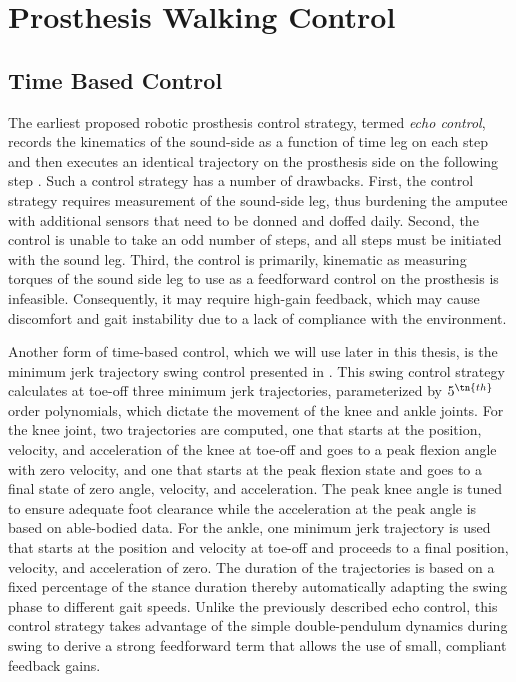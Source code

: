 \section{Prosthesis Walking Control}\label{sec:back_walking_control}

\subsection{Time Based Control}
The earliest proposed robotic prosthesis control strategy, termed \emph{echo
control}, records the kinematics of the sound-side as a function of time leg on
each step and then executes an identical trajectory on the prosthesis side on
the following step \citep{grimes1977feasibility,grimes1979active}. Such a
control strategy has a number of drawbacks. First, the control strategy requires
measurement of the sound-side leg, thus burdening the amputee with additional
sensors that need to be donned and doffed daily. Second, the control is unable
to take an odd number of steps, and all steps must be initiated with the sound
leg. Third, the control is primarily, kinematic as measuring torques of the
sound side leg to use as a feedforward control on the prosthesis is infeasible.
Consequently, it may require high-gain feedback, which may cause discomfort and
gait instability due to a lack of compliance with the environment.  

Another form of time-based control, which we will use later in this thesis, is
the minimum jerk trajectory swing control presented in \citet{lenzi2014speed}.
This swing control strategy calculates at toe-off three minimum jerk
trajectories, parameterized by $5^\tn{th}$ order polynomials, which dictate the
movement of the knee and ankle joints. For the knee joint, two trajectories are
computed, one that starts at the position, velocity, and acceleration of the
knee at toe-off and goes to a peak flexion angle with zero velocity, and one
that starts at the peak flexion state and goes to a final state of zero angle,
velocity, and acceleration. The peak knee angle is tuned to ensure adequate foot
clearance while the acceleration at the peak angle is based on able-bodied data.
For the ankle, one minimum jerk trajectory is used that starts at the position
and velocity at toe-off and proceeds to a final position, velocity, and
acceleration of zero. The duration of the trajectories is based on a fixed
percentage of the stance duration thereby automatically adapting the swing phase
to different gait speeds. Unlike the previously described echo control, this
control strategy takes advantage of the simple double-pendulum dynamics during
swing to derive a strong feedforward term that allows the use of small,
compliant feedback gains.

